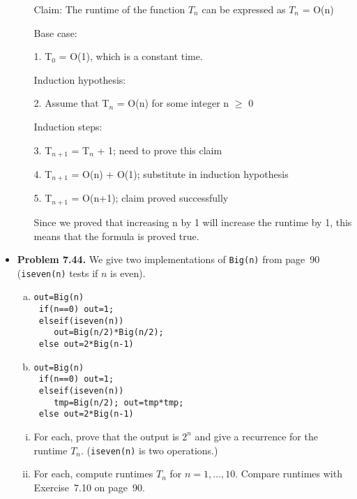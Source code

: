 \documentclass[11pt]{article}
\begin{document}
\begin{itemize}
\begin{enumerate}[(a)]
  Claim: The runtime of the function $T_n$ can be expressed as $T_n$ = O(n)
  
  Base case:
  
  1. T$_{0}$ = O(1), which is a constant time.
  
  Induction hypothesis:
  
  2. Assume that T$_{n}$ = O(n) for some integer n $\geq$ 0
  
  Induction steps:
  
  3. T$_{n+1}$ = T$_{n}$ + 1; need to prove this claim
  
  4. T$_{n+1}$ = O(n) + O(1); substitute in induction hypothesis
  
  5. T$_{n+1}$ = O(n+1); claim proved successfully
  
  Since we proved that increasing n by 1 will increase the runtime by 1, this means that the formula is proved true.
  
    
  \end{enumerate}
  

\vspace{0.1in}

\item \textbf{Problem 7.44.}
We give two implementations of \verb+Big(n)+ from page~90
(\verb+iseven(n)+ tests if $n$ is even).
\begin{multicols}{2}
\begin{enumerate}[(a)]
\item
\begin{verbatim}
out=Big(n)
 if(n==0) out=1;
 elseif(iseven(n))
    out=Big(n/2)*Big(n/2);
 else out=2*Big(n-1)
\end{verbatim}
\item
\begin{verbatim}
out=Big(n)
 if(n==0) out=1;
 elseif(iseven(n))
    tmp=Big(n/2); out=tmp*tmp;
 else out=2*Big(n-1)
\end{verbatim}
\end{enumerate}
\end{multicols}

\begin{enumerate}[(i)]
\item For each, prove that the output is $2^n$ and give a recurrence for the runtime $T_n$.
  (\verb+iseven(n)+ is two operations.)
\item For each, compute runtimes $T_n$ for $n=1,\ldots,10$.
  Compare runtimes with Exercise~7.10 on page~90.
\end{enumerate}

\vspace{0.1in}


\end{itemize}
\end{document}
